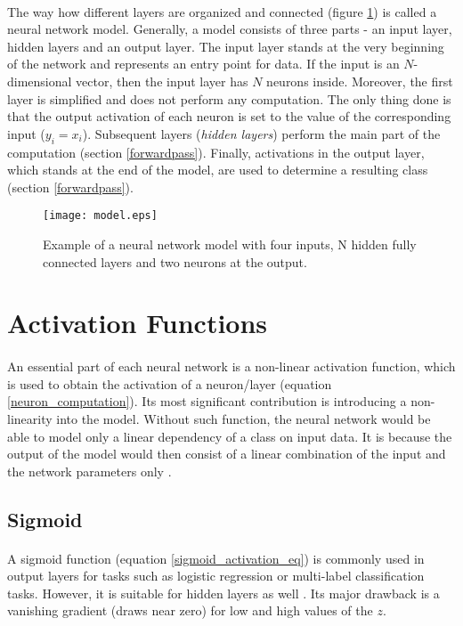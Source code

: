 \paragraph{}
The way how different layers are organized and connected (figure \ref{nn_model}) is called a neural network model. Generally, a model consists of three parts - an input layer, hidden layers and an output layer. The input layer stands at the very beginning of the network and represents an entry point for data. If the input is an $N$-dimensional vector, then the input layer has $N$ neurons inside. Moreover, the first layer is simplified and does not perform any computation. The only thing done is that the output activation of each neuron is set to the value of the corresponding input ($y_i = x_i$). Subsequent layers (\textit{hidden layers}) perform the main part of the computation (section \ref{forwardpass}). Finally, activations in the output layer, which stands at the end of the model, are used to determine a resulting class (section \ref{forwardpass}). 

\begin{figure}[!h]
	\texttt{[image: model.eps]}
	\centering
	\caption{Example of a neural network model with four inputs, N hidden fully connected layers and two neurons at the output.}
	\label{nn_model}
\end{figure}

\section{Activation Functions}\label{activation_function}
\paragraph{}
An essential part of each neural network is a non-linear activation function, which is used to obtain the activation of a neuron/layer (equation \ref{neuron_computation}). Its most significant contribution is introducing a non-linearity into the model. Without such function, the neural network would be able to model only a linear dependency of a class on input data. It is because the output of the model would then consist of a linear combination of the input and the network parameters only \cite{deep_learning_with_python}.

\subsection{Sigmoid}
\paragraph{}
A sigmoid function (equation \ref{sigmoid_activation_eq}) is commonly used in output layers for tasks such as logistic regression or multi-label classification tasks. However, it is suitable for hidden layers as well \cite{python_ml_2nd}. Its major drawback is a vanishing gradient (draws near zero) for low and high values of the $z$. 

